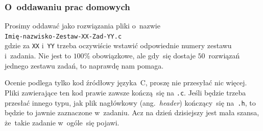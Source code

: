 \documentclass[10pt,t]{beamer}
\begin{document}
\begin{frame}




\end{frame}





\begin{frame}
  \frametitle{O~oddawaniu prac domowych}


  Prosimy oddawać jako rozwiązania pliki o~nazwie \\
  \texttt{Imię-nazwisko-Zestaw-XX-Zad-YY.c} \\
  gdzie za \texttt{XX} i~\texttt{YY} trzeba oczywiście wstawić odpowiednie
  numery zestawu i~zadania. Nie jest to $100$\% obowiązkowe, ale gdy~się
  dostaje $50$~rozwiązań jednego zestawu zadań, to naprawdę nam pomaga.

  Ocenie podlega tylko kod źródłowy języka~C, proszę nie przesyłać nic
  więcej. Pliki zawierające ten kod prawie zawsze kończą~się na
  \texttt{.c}. Jeśli będzie trzeba przesłać innego typu, jak plik
  nagłówkowy (ang.~\textit{header}) kończący~się na~\texttt{.h}, to będzie
  to jawnie zaznaczone w~zadaniu. Acz na dzień dzisiejszy jest mała szansa,
  że~takie zadanie w~ogóle~się pojawi.

\end{frame}
\end{document}

